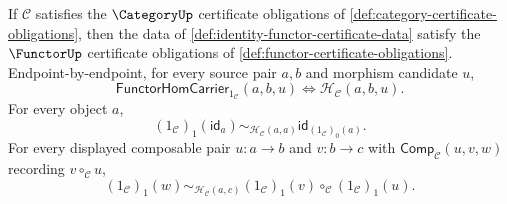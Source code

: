 \begin{theorem}
\label{thm:identity-functor-namecert}
If $\mathcal C$ satisfies the $\CategoryUp$ certificate obligations of
\autoref{def:category-certificate-obligations}, then the data of
\autoref{def:identity-functor-certificate-data} satisfy the $\FunctorUp$
certificate obligations of \autoref{def:functor-certificate-obligations}.
Endpoint-by-endpoint, for every source pair $a,b$ and morphism candidate $u$,
$$
\mathsf{FunctorHomCarrier}_{1_{\mathcal C}}(a,b,u)
\Longleftrightarrow
\mathcal H_{\mathcal C}(a,b,u).
$$
For every object $a$,
$$
(1_{\mathcal C})_1(\mathsf{id}_a)
\sim_{\mathcal H_{\mathcal C}(a,a)}
\mathsf{id}_{(1_{\mathcal C})_0(a)}.
$$
For every displayed composable pair $u:a\to b$ and $v:b\to c$ with
$\mathsf{Comp}_{\mathcal C}(u,v,w)$ recording $v\circ_{\mathcal C}u$,
$$
(1_{\mathcal C})_1(w)
\sim_{\mathcal H_{\mathcal C}(a,c)}
(1_{\mathcal C})_1(v)\circ_{\mathcal C}(1_{\mathcal C})_1(u).
$$
\end{theorem}
